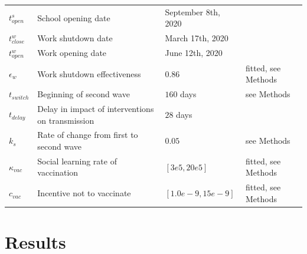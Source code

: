 \begin{table}[H]
\begin{tabular}{llll}
  $ t^s_{open} $ & School opening date & September 8th, 2020 &  \cite{school_opening} \\
  $ t^w_{close} $ &   Work shutdown date & March 17th, 2020 & \cite{ontario_reopening}\\
  $ t^w_{open}  $ & Work opening date &  June 12th, 2020 & \cite{ontario_reopening}\\
  $ \epsilon_w $ & Work shutdown effectiveness & $0.86$ & fitted, see Methods \\
  $ t_{switch} $ & Beginning of second wave & $160 $ days &  see Methods \\ 
  $ t_{delay} $ & Delay in impact of interventions on transmission & $28$ days &  \cite{li2020temporal} \\ 
  $k_s$ & Rate of change from first to second wave & $0.05$ &  see Methods \\ 
  $ \kappa_{vac}$ & Social learning rate of vaccination & $[3e5,20e5] $& fitted, see Methods \\
  $ c_{vac}$ & Incentive not to vaccinate & $[1.0e-9,15e-9]$& fitted, see Methods \\
  \bottomrule  
  \end{tabular}
  \label{tab:params}
  \end{table}
\normalsize



\section{Results} 

